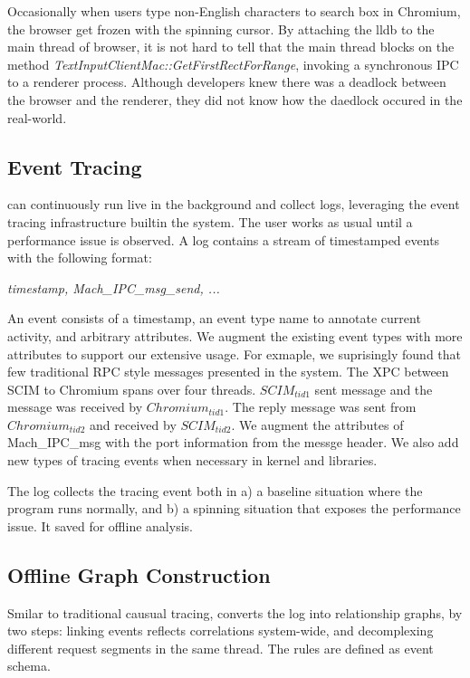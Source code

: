 Occasionally when users type non-English characters to search box in Chromium,
the browser get frozen with the spinning cursor.
By attaching the lldb to the main thread of browser, it is not hard to tell that
the main thread blocks on the method \textit{TextInputClientMac::GetFirstRectForRange},
invoking a synchronous IPC to a renderer process.
Although developers knew there was a deadlock between the browser and the renderer,
they did not know how the daedlock occured in the real-world.


\subsection{Event Tracing}

\xxx can continuously run live in the background and collect logs,
leveraging the event tracing infrastructure builtin the system.
The user works as usual until a performance issue is observed.
A log contains a stream of timestamped events with the following format:

\textit{timestamp, Mach\_IPC\_msg\_send, ...}

An event consists of a timestamp, an event type name to annotate current activity,
and arbitrary attributes.
We augment the existing event types with more attributes to support our extensive usage.
For exmaple, we suprisingly found that few traditional RPC style messages presented in the system.
The XPC between SCIM to Chromium spans over four threads.
$SCIM_{tid1}$ sent message and the message was received by $Chromium_{tid1}$.
The reply message was sent from $Chromium_{tid2}$ and received by $SCIM_{tid2}$.
We augment the attributes of Mach\_IPC\_msg with the port information from the messge header.
We also add new types of tracing events when necessary in kernel and libraries.

The log collects the tracing event both in 
a) a baseline situation where the program runs normally,
and b) a spinning situation that exposes the performance issue.
It saved for offline analysis.

\subsection{Offline Graph Construction}
Smilar to traditional causual tracing,
\xxx converts the log into relationship graphs,
by two steps:
linking events reflects correlations system-wide, 
and decomplexing different request segments in the same thread.
The rules are defined as event schema.

